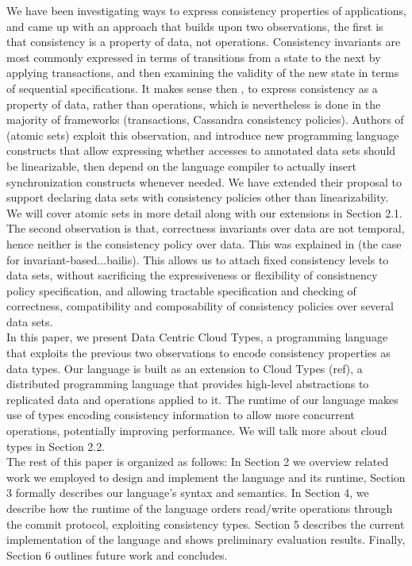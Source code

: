 We have been investigating ways to express consistency properties of
applications, and came up with an approach that builds upon two observations, the
first is that consistency is a property of data, not operations. Consistency
invariants are most commonly expressed in terms of transitions from a state to the
next by applying transactions, and then examining the validity of the new state
in terms of sequential specifications. It makes sense then , to express 
consistency as a property of data, rather than
operations, which is nevertheless is done in the majority of frameworks (transactions, Cassandra
consistency policies). Authors of (atomic sets) exploit this observation, and
introduce new programming language constructs that allow expressing whether
accesses to annotated data sets should be linearizable, then depend on the language compiler to
actually insert synchronization constructs whenever needed. We have extended
their proposal to support declaring data sets with consistency policies other
than linearizability. We will cover atomic sets in more detail along with our
extensions in Section 2.1. \\
The second observation is that, correctness invariants over data are not temporal, hence
neither is the consistency policy over data. This was explained in (the case for
invariant-based...bailis). This allows us to attach fixed consistency levels to
data sets, without sacrificing the expressiveness or flexibility of consistnency
policy specification, and allowing tractable specification and checking of
correctness, compatibility and composability of consistency policies over
several data sets. \\

In this paper, we present Data Centric Cloud Types, a programming language that
exploits the previous two observations to encode consistency properties as data
types. Our language is built as an extension to Cloud Types (ref), 
a distributed programming language that provides high-level abstractions to replicated
data and operations applied to it. The runtime of our language makes use of
types encoding 
consistency information to allow more concurrent operations, potentially
improving performance. We will talk more about cloud types in Section 2.2. \\

The rest of this paper is organized as follows: In Section 2 we overview related
work we employed to design and implement the language and its runtime,
Section 3 formally describes our language's syntax and
semantics. In Section 4, we describe how the runtime of the language orders
read/write operations through the commit protocol, exploiting consistency types. 
Section 5 describes the current implementation of the language and shows preliminary evaluation
results. Finally, Section 6 outlines future work and concludes. 

